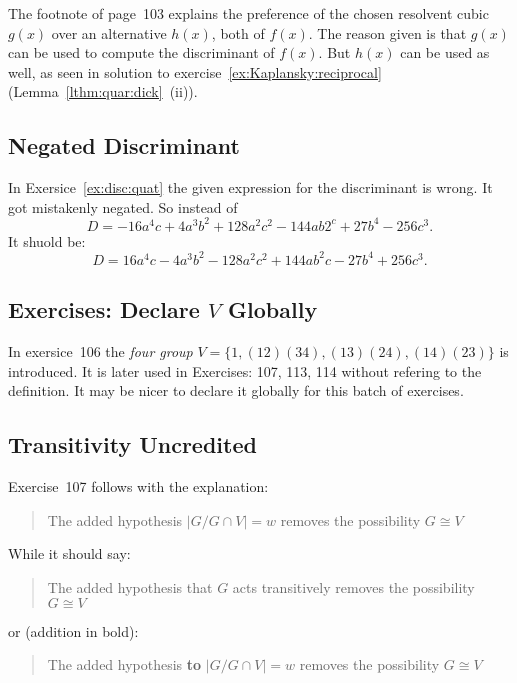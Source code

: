 The footnote of page~103 explains the preference of the chosen
resolvent cubic \(g(x)\)
over an alternative \(h(x)\), both of \(f(x)\).
The reason given is that \(g(x)\) can be used to
compute the discriminant of \(f(x)\).
But \(h(x)\) can be used as well, as seen in
solution to exercise~\ref{ex:Kaplansky:reciprocal} 
(Lemma~\ref{lthm:quar:dick}~(ii)).


\subsection{Negated Discriminant} \label{ss:neg:disc}

In Exersice~\ref{ex:disc:quat} the given expression
for the discriminant is wrong. It got mistakenly negated.
So instead of
\begin{equation*}
 D = -16a^4c + 4a^3b^2 + 128a^2c^2  - 144ab2^c + 27b^4 -256c^3.
\end{equation*}
It shuold be:
\begin{equation*}
 D = 16a^4c - 4a^3b^2 - 128a^2c^2 + 144ab^2c - 27b^4 + 256c^3.
\end{equation*}


\subsection{Exercises: Declare $V$ Globally}

In exersice~106 the \emph{four group}
\(V = \{1,(12)(34),(13)(24),(14)(23)\}\)
is introduced. It is later used in Exercises: 107, 113, 114 without
refering to the definition. It may be nicer to declare it globally
for this batch of exercises.


\subsection{Transitivity Uncredited}  \label{ss:trans:uncred}

Exercise~107 follows with the explanation:
\begin{quotation}
The added hypothesis \(|G/G\cap V|=w\) removes
the possibility \(G\cong V\) \mldots
\end{quotation}
While it should say:
\begin{quotation}
The added hypothesis that $G$ acts transitively removes
the possibility \(G\cong V\) \mldots
\end{quotation}
or (addition in bold):
\begin{quotation}
The added hypothesis \textbf{to} \(|G/G\cap V|=w\) removes
the possibility \(G\cong V\) \mldots
\end{quotation}

